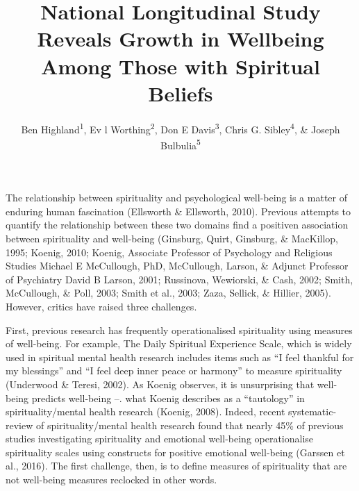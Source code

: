 \documentclass[
  english,
  man]{apa6}
\title{National Longitudinal Study Reveals Growth in Wellbeing Among Those with Spiritual Beliefs}
\author{Ben Highland\textsuperscript{1}, Ev l Worthing\textsuperscript{2}, Don E Davis\textsuperscript{3}, Chris G. Sibley\textsuperscript{4}, \& Joseph Bulbulia\textsuperscript{5}}
\date{}
\affiliation{\phantom{0}}
\begin{document}
\maketitle

The relationship between spirituality and psychological well-being is a matter of enduring human fascination (Ellsworth \& Ellsworth, 2010). Previous attempts to quantify the relationship between these two domains find a positiven association between spirituality and well-being (Ginsburg, Quirt, Ginsburg, \& MacKillop, 1995; Koenig, 2010; Koenig, Associate Professor of Psychology and Religious Studies Michael E McCullough, PhD, McCullough, Larson, \& Adjunct Professor of Psychiatry David B Larson, 2001; Russinova, Wewiorski, \& Cash, 2002; Smith, McCullough, \& Poll, 2003; Smith et al., 2003; Zaza, Sellick, \& Hillier, 2005). However, critics have raised three challenges.

First, previous research has frequently operationalised spirituality using measures of well-being. For example, The Daily Spiritual Experience Scale, which is widely used in spiritual mental health research includes items such as \enquote{I feel thankful for my blessings} and \enquote{I feel deep inner peace or harmony} to measure spirituality (Underwood \& Teresi, 2002). As Koenig observes, it is unsurprising that well-being predicts well-being --. what Koenig describes as a \enquote{tautology} in spirituality/mental health research (Koenig, 2008). Indeed, recent systematic-review of spirituality/mental health research found that nearly 45\% of previous studies investigating spirituality and emotional well-being operationalise spirituality scales using constructs for positive emotional well-being (Garssen et al., 2016). The first challenge, then, is to define measures of spirituality that are not well-being measures reclocked in other words.
\end{document}
